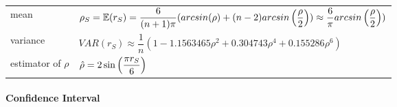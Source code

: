 \begin{customTableWrapper}{2}
\begin{table}[H]
    \begin{tabular}{l l}
        mean & $
            \rho_S 
            = \mathbb{E}(r_S)
            = \dfrac{6}{(n+1)\pi}
                (arcsin(\rho) + 
                (n - 2) arcsin\left(\dfrac{\rho}{2}\right))
            \approx \dfrac{6}{\pi} arcsin\left(\dfrac{\rho}{2}\right))
        $ \\

        variance & $
            VAR(r_S)
            \approx \dfrac{1}{n} 
                (1 - 1.1563465\rho^{2} + 0.304743\rho^{4} + 0.155286\rho^{6})
        $ \\

        estimator of $\rho$ & $
            \hat{\rho} = 2\sin\left(\dfrac{\pi r_S}{6} \right)
        $ \\

        
    \end{tabular}
\end{table}
\end{customTableWrapper}

\paragraph{Confidence Interval}

